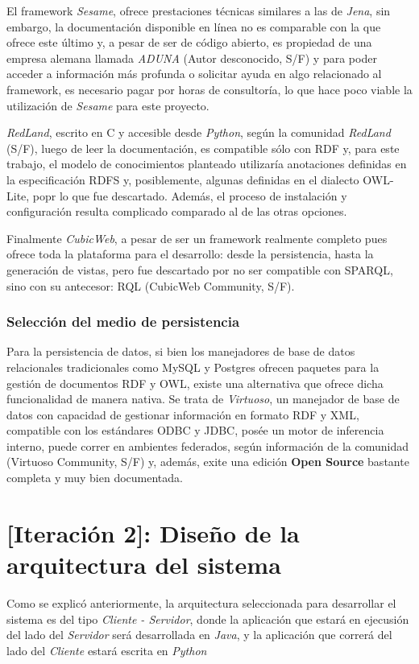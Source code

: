 El framework \textit{Sesame}, ofrece prestaciones técnicas similares a las de \textit{Jena}, sin embargo, la documentación disponible en línea no es comparable con la que ofrece este último y, a pesar de ser de código abierto, es propiedad de una empresa alemana llamada \textit{ADUNA} (Autor desconocido, S/F) y para poder acceder a información más profunda o solicitar ayuda en algo relacionado al framework, es necesario pagar por horas de consultoría, lo que hace poco viable la utilización de \textit{Sesame} para este proyecto.

\textit{RedLand}, escrito en C y accesible desde \textit{Python}, según la comunidad \textit{RedLand} (S/F), luego de leer la documentación, es compatible sólo con RDF y, para este trabajo, el modelo de conocimientos planteado utilizaría anotaciones definidas en la especificación RDFS y, posiblemente, algunas definidas en el dialecto OWL-Lite, popr lo que fue descartado. Además, el proceso de instalación y configuración resulta complicado comparado al de las otras opciones.

Finalmente \textit{CubicWeb}, a pesar de ser un framework realmente completo pues ofrece toda la plataforma para el desarrollo: desde la persistencia, hasta la generación de vistas, pero fue descartado por no ser compatible con SPARQL, sino con su antecesor: RQL (CubicWeb Community, S/F).

\subsubsection{Selección del medio de persistencia}
Para la persistencia de datos, si bien los manejadores de base de datos relacionales tradicionales como MySQL y Postgres ofrecen paquetes para la gestión de documentos RDF y OWL, existe una alternativa que ofrece dicha funcionalidad de manera nativa. Se trata de \textit{Virtuoso}, un manejador de base de datos con capacidad de gestionar información en formato RDF y XML, compatible con los estándares ODBC y JDBC, posée un motor de inferencia interno, puede correr en ambientes federados, según información de la comunidad (Virtuoso Community, S/F) y, además, exite una edición \textbf{Open Source} bastante completa y muy bien documentada.

\section{[Iteración 2]: Diseño de la arquitectura del sistema}
Como se explicó anteriormente, la arquitectura seleccionada para desarrollar el sistema es del tipo \textit{Cliente - Servidor}, donde la aplicación que estará en ejecusión del lado del \textit{Servidor} será desarrollada en \textit{Java}, y la aplicación que correrá del lado del \textit{Cliente} estará escrita en \textit{Python}

